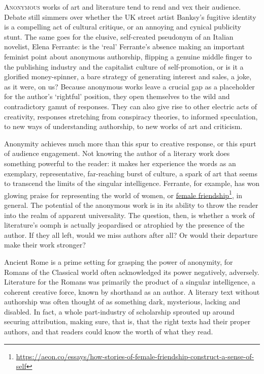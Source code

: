 \documentclass[../main.tex]{subfiles}
\begin{document}
\begin{multicols}{2}

\lettrine{A}{nonymous} works of art and literature tend to rend and vex their audience. Debate still simmers over whether the UK street artist Banksy’s fugitive identity is a compelling act of cultural critique, or an annoying and cynical publicity stunt. The same goes for the elusive, self-created pseudonym of an Italian novelist, Elena Ferrante: is the ‘real’ Ferrante’s absence making an important feminist point about anonymous authorship, flipping a genuine middle finger to the publishing industry and the capitalist culture of self-promotion, or is it a glorified money-spinner, a bare strategy of generating interest and sales, a joke, as it were, on us? Because anonymous works leave a crucial gap as a placeholder for the author’s ‘rightful’ position, they open themselves to the wild and contradictory gamut of responses. They can also give rise to other electric acts of creativity, responses stretching from conspiracy theories, to informed speculation, to new ways of understanding authorship, to new works of art and criticism. 

Anonymity achieves much more than this spur to creative response, or this spurt of audience engagement. Not knowing the author of a literary work does something powerful to the reader: it makes her experience the words as an exemplary, representative, far-reaching burst of culture, a spark of art that seems to transcend the limits of the singular intelligence. Ferrante, for example, has won glowing praise for representing the world of women, or \href{https://aeon.co/essays/how-stories-of-female-friendship-construct-a-sense-of-self}{female friendship}\footnote{\url{https://aeon.co/essays/how-stories-of-female-friendship-construct-a-sense-of-self}}, in general. The potential of the anonymous work is in its ability to throw the reader into the realm of apparent universality. The question, then, is whether a work of literature’s oomph is actually jeopardised or atrophied by the presence of the author. If they all left, would we miss authors after all? Or would their departure make their work stronger? 

Ancient Rome is a prime setting for grasping the power of anonymity, for Romans of the Classical world often acknowledged its power negatively, adversely. Literature for the Romans was primarily the product of a singular intelligence, a coherent creative force, known by shorthand as an author. A literary text without authorship was often thought of as something dark, mysterious, lacking and disabled. In fact, a whole part-industry of scholarship sprouted up around securing attribution, making sure, that is, that the right texts had their proper authors, and that readers could know the worth of what they read. 


\end{multicols}
\end{document}
